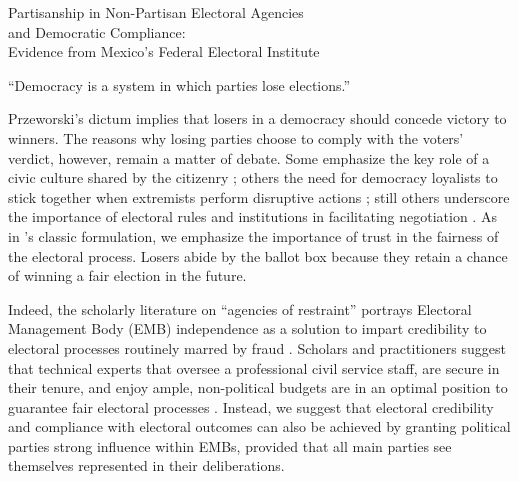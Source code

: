\documentclass[12 pt, letter]{article}
\begin{document}
\begin{center}
\Large{Partisanship in Non-Partisan Electoral Agencies\\ and Democratic Compliance:\\ Evidence from Mexico's Federal Electoral Institute}
\end{center}
\bigskip

\begin{flushright}
``Democracy is a system in which parties lose elections.'' \\ \citet[p. 10]{Przeworski1991} 
\end{flushright}

\doublespace \noindent Przeworski's dictum implies that losers in a democracy should concede victory to winners. The reasons why losing parties choose to comply with the voters' verdict, however, remain a matter of debate. Some emphasize the key role of a civic culture shared by the citizenry \citep[e.g.,][]{Putnam2000}; others the need for democracy loyalists to stick together when extremists perform disruptive actions \citep[e.g.,][]{Linz1978}; still others underscore the importance of electoral rules and institutions in facilitating negotiation \citep[e.g.,][]{Jones1995}. As in \citeauthor{Przeworski1991}'s classic formulation, we emphasize the importance of trust in the fairness of the electoral process. Losers abide by the ballot box because they retain a chance of winning a fair election in the future.

Indeed, the scholarly literature on ``agencies of restraint'' portrays Electoral Management Body (EMB) independence as a solution to impart credibility to electoral processes routinely marred by fraud \citep{Schedler1999, Hartlyn2006}.  Scholars and practitioners suggest that technical experts that oversee a professional civil service staff, are secure in their tenure, and enjoy ample, non-political budgets are in an optimal position to guarantee fair electoral processes \citep[see references in][]{LopezPintor2000, Mozaffar2002}. Instead, we suggest that electoral credibility and compliance with electoral outcomes can also be achieved by granting political parties strong influence within EMBs, provided that all main parties see themselves represented in their deliberations.
\end{document}
